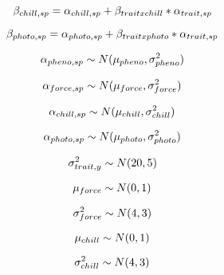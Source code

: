 \documentclass{article}
\begin{document}
\begin{equation}
\beta_{chill,sp} = \alpha_{chill,sp} + \beta_{trait x chill}*\alpha_{trait, sp} \\
\end{equation}

\begin{equation}
\beta_{photo,sp} = \alpha_{photo,sp} + \beta_{trait x photo}*\alpha_{trait, sp} \\
\end{equation}

\begin{equation}
\alpha_{pheno,sp}\sim N(\mu_{pheno}, \sigma^2_{pheno})\\
\end{equation}

\begin{equation}
\alpha_{force,sp}\sim N(\mu_{force}, \sigma^2_{force})\\
\end{equation}

\begin{equation}
\alpha_{chill,sp}\sim N(\mu_{chill}, \sigma^2_{chill})\\
\end{equation}

\begin{equation}
\alpha_{photo,sp}\sim N(\mu_{photo}, \sigma^2_{photo})\\
\end{equation}

\begin{equation}
\sigma^2_{trait, y}\sim N(20,  5)\\
\end{equation}

\begin{equation}
\mu_{force} \sim N(0,1)\\
\end{equation}

\begin{equation}
\sigma^2_{force}\sim N(4,3)\\
\end{equation}

\begin{equation}
\mu_{chill} \sim N(0,1)\\
\end{equation}

\begin{equation}
\sigma^2_{chill} \sim N(4,3)\\
\end{equation}
\end{document}
